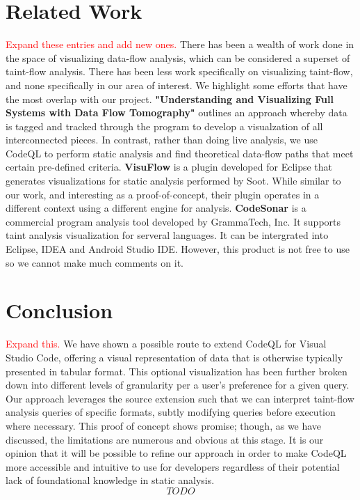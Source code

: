 \documentclass[sigplan,10pt,review]{acmart}
\begin{document}
\section{Related Work}
\textcolor{red}{Expand these entries and add new ones. \newline}
There has been a wealth of work done in the space of visualizing data-flow analysis, which can be considered a superset of taint-flow analysis. There has been less work specifically on visualizing taint-flow, and none specifically in our area of interest. We highlight some efforts that have the most overlap with our project.
\newline\newline
\indent \textbf{"Understanding and Visualizing Full Systems with Data Flow Tomography"} \cite{10.1145/1353535.1346308} outlines an approach whereby data is tagged and tracked through the program to develop a visualzation of all interconnected pieces. In contrast, rather than doing live analysis, we use CodeQL to perform static analysis and find theoretical data-flow paths that meet certain pre-defined criteria.
\newline\newline
\indent \textbf {VisuFlow} \cite{10.1145/3183440.3183470} is a plugin developed for Eclipse that generates visualizations for static analysis performed by Soot. While similar to our work, and interesting as a proof-of-concept, their plugin operates in a different context using a different engine for analysis.
\newline\newline
\indent \textbf {CodeSonar} is a commercial program analysis tool developed by GrammaTech, Inc. It supports taint analysis visualization for serveral languages. It can be intergrated into Eclipse, IDEA and Android Studio IDE. However, this product is not free to use so we cannot make much comments on it.

\section{Conclusion}
\textcolor{red}{Expand this.\newline}
We have shown a possible route to extend CodeQL for Visual Studio Code, offering a visual representation of data that is otherwise typically presented in tabular format. This optional visualization has been further broken down into different levels of granularity per a user's preference for a given query. Our approach leverages the source extension such that we can interpret taint-flow analysis queries of specific formats, subtly modifying queries before execution where necessary.
\newline
\indent
This proof of concept shows promise; though, as we have discussed, the limitations are numerous and obvious at this stage. It is our opinion that it will be possible to refine our approach in order to make CodeQL more accessible and intuitive to use for developers regardless of their potential lack of foundational knowledge in static analysis.
\[TODO\]


\end{document}
